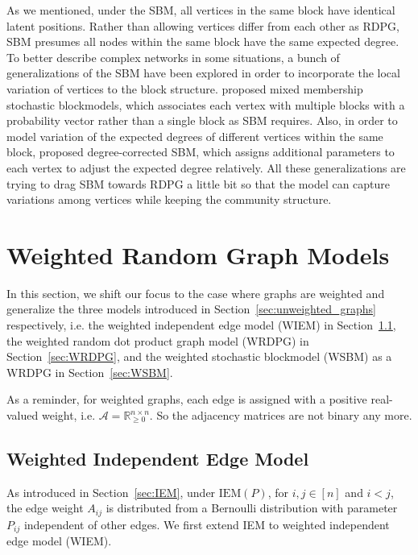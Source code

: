 \begin{remark}
\label{remark:other_models}
As we mentioned, under the SBM, all vertices in the same block have identical latent positions. Rather than allowing vertices differ from each other as RDPG, SBM presumes all nodes within the same block have the same expected degree. To better describe complex networks in some situations, a bunch of generalizations of the SBM have been explored in order to incorporate the local variation of vertices to the block structure. \citet{airoldi2008mixed} proposed mixed membership stochastic blockmodels, which associates each vertex with multiple blocks with a probability vector rather than a single block as SBM requires. Also, in order to model variation of the expected degrees of different vertices within the same block, \citet{karrer2011stochastic} proposed degree-corrected SBM, which assigns additional parameters to each vertex to adjust the expected degree relatively. All these generalizations are trying to drag SBM towards RDPG a little bit so that the model can capture variations among vertices while keeping the community structure.
\end{remark}




\section{Weighted Random Graph Models}
\label{sec:weighted_graphs}

In this section, we shift our focus to the case where graphs are weighted and generalize the three models introduced in Section~\ref{sec:unweighted_graphs} respectively, i.e. the weighted independent edge model (WIEM) in Section~\ref{sec:WIEM}, the weighted random dot product graph model (WRDPG) in Section~\ref{sec:WRDPG}, and the weighted stochastic blockmodel (WSBM) as a WRDPG in Section~\ref{sec:WSBM}.

As a reminder, for weighted graphs, each edge is assigned with a positive real-valued weight, i.e. $\mathcal{A} = \mathbb{R}^{n \times n}_{\ge 0}$. So the adjacency matrices are not binary any more.


\subsection{Weighted Independent Edge Model}
\label{sec:WIEM}

As introduced in Section~\ref{sec:IEM}, under $\mathrm{IEM}(P)$, for $i, j \in [n]$ and $i < j$, the edge weight $A_{ij}$ is distributed from a Bernoulli distribution with parameter $P_{ij}$ independent of other edges.
We first extend IEM to weighted independent edge model (WIEM).

